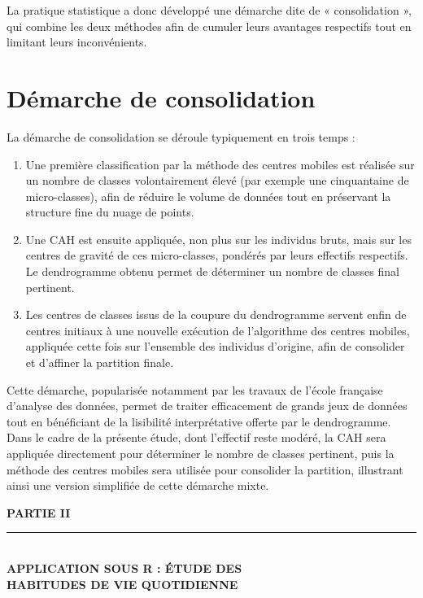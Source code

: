 \documentclass[11pt,a4paper]{report}
\begin{document}
	La pratique statistique a donc développé une démarche dite de « consolidation », qui combine les deux méthodes afin de cumuler leurs avantages respectifs tout en limitant leurs inconvénients.
	
	\section{Démarche de consolidation}
	
	La démarche de consolidation se déroule typiquement en trois temps :
	
	\begin{enumerate}
		\item Une première classification par la méthode des centres mobiles est réalisée sur un nombre de classes volontairement élevé (par exemple une cinquantaine de micro-classes), afin de réduire le volume de données tout en préservant la structure fine du nuage de points.
		\item Une CAH est ensuite appliquée, non plus sur les individus bruts, mais sur les centres de gravité de ces micro-classes, pondérés par leurs effectifs respectifs. Le dendrogramme obtenu permet de déterminer un nombre de classes final pertinent.
		\item Les centres de classes issus de la coupure du dendrogramme servent enfin de centres initiaux à une nouvelle exécution de l'algorithme des centres mobiles, appliquée cette fois sur l'ensemble des individus d'origine, afin de consolider et d'affiner la partition finale.
	\end{enumerate}
	
	Cette démarche, popularisée notamment par les travaux de l'école française d'analyse des données, permet de traiter efficacement de grands jeux de données tout en bénéficiant de la lisibilité interprétative offerte par le dendrogramme. Dans le cadre de la présente étude, dont l'effectif reste modéré, la CAH sera appliquée directement pour déterminer le nombre de classes pertinent, puis la méthode des centres mobiles sera utilisée pour consolider la partition, illustrant ainsi une version simplifiée de cette démarche mixte.
	
	\cleardoublepage
	\thispagestyle{plain}
	\vspace*{4cm}
	\begin{center}
		{\Huge\bfseries\color{navy} PARTIE II}\\[0.6cm]
		{\color{accent}\rule{0.5\textwidth}{1pt}}\\[0.6cm]
		{\Large\bfseries\color{accent} APPLICATION SOUS R : ÉTUDE DES\\ HABITUDES DE VIE QUOTIDIENNE}
	\end{center}
	\clearpage
	
\end{document}
